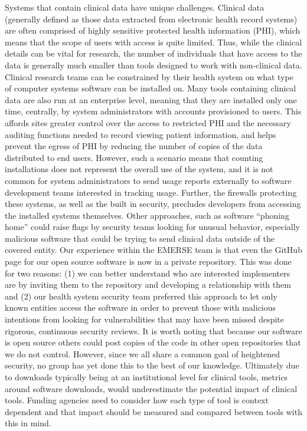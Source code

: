 \documentclass{article}
\begin{document}
Systems that contain clinical data have unique challenges.  Clinical data (generally defined as those data extracted from electronic health record systems) are often comprised of highly sensitive protected health information (PHI), which means that the scope of users with access is quite limited. Thus, while the clinical details can be vital for research, the number of individuals that have access to the data is generally much smaller than tools designed to work with non-clinical data. Clinical research teams can be constrained by their health system on what type of computer systems software can be installed on. Many tools containing clinical data are also run at an enterprise level, meaning that they are installed only one time, centrally, by system administrators with accounts provisioned to users. This affords sites greater control over the access to restricted PHI and the necessary auditing functions needed to record viewing patient information, and helps prevent the egress of PHI by reducing the number of copies of the data distributed to end users.  However, such a scenario means that counting installations does not represent the overall use of the system, and it is not common for system administrators to send usage reports externally to software development teams interested in tracking usage.  Further, the firewalls protecting these systems, as well as the built in security, precludes developers from accessing the installed systems themselves. Other approaches, such as software “phoning home” could raise flags by security teams looking for unusual behavior, especially malicious software that could be trying to send clinical data outside of the covered entity. Our experience within the EMERSE team is that even the GitHub page for our open source software is now in a private repository. This was done for two reasons: (1) we can better understand who are interested implementers are by inviting them to the repository and developing a relationship with them and (2) our health system security team preferred this approach to let only known entities access the software in order to prevent those with malicious intentions from looking for vulnerabilities that may have been missed despite rigorous, continuous security reviews.  It is worth noting that because our software is open source others could post copies of the code in other open repositories that we do not control.  However, since we all share a common goal of heightened security, no group has yet done this to the best of our knowledge. Ultimately due to downloads typically being at an institutional level for clinical tools, metrics around software downloads, would underestimate the potential impact of clinical tools. Funding agencies need to consider how each type of tool is context dependent and that impact should be measured and compared between tools with this in mind.  
\end{document}
